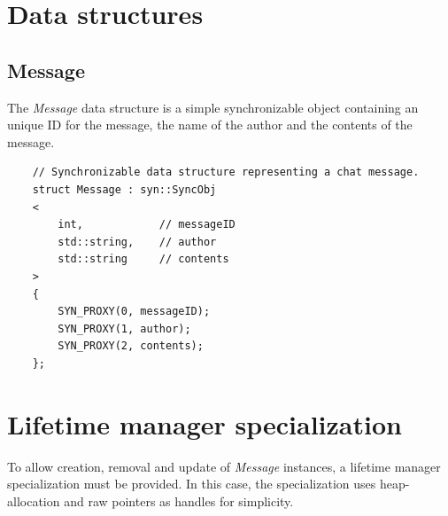 \documentclass{report}
\def \cppStart {\begin{verbatim}}
\begin{document}
        \section{Data structures}

            \subsection{Message}

                The \emph{Message} data structure is a simple synchronizable object containing an unique ID for the message, the name of the author and the contents of the message.

            \cppStart
    // Synchronizable data structure representing a chat message.
    struct Message : syn::SyncObj
    <
        int,            // messageID
        std::string,    // author
        std::string     // contents
    >
    {
        SYN_PROXY(0, messageID);
        SYN_PROXY(1, author);
        SYN_PROXY(2, contents);
    };
            \end{verbatim}                

        \section{Lifetime manager specialization}

            To allow creation, removal and update of \emph{Message} instances, a lifetime manager specialization must be provided.
            In this case, the specialization uses heap-allocation and raw pointers as handles for simplicity.
\end{document}
